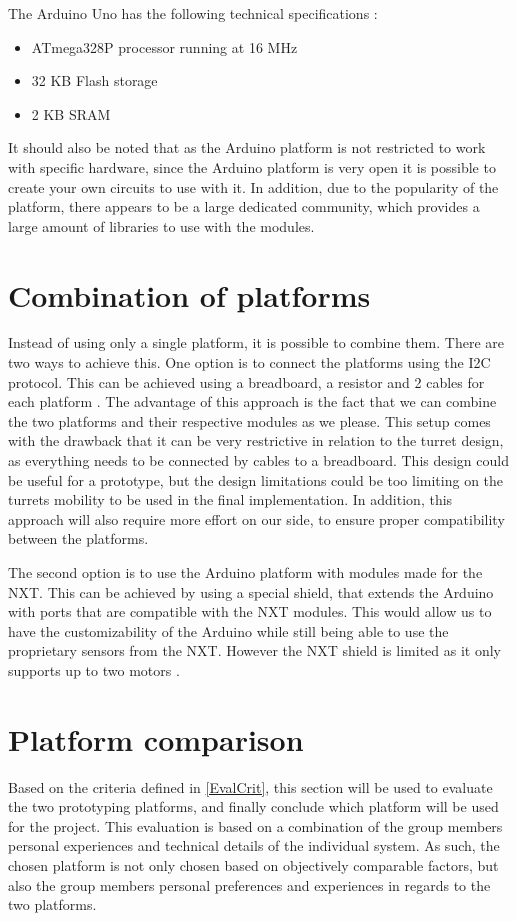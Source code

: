 The Arduino Uno has the following technical specifications \citep{UNOSpecs}:

\begin{itemize}
  \item ATmega328P processor running at 16 MHz 
  \item 32 KB Flash storage
  \item 2 KB SRAM
\end{itemize}

It should also be noted that as the Arduino platform is not restricted to work
with specific hardware, since the Arduino platform is very open it is possible
to create your own circuits to use with it. In addition, due to the popularity
of the platform, there appears to be a large dedicated community, which provides
a large amount of libraries to use with the modules. 

\section{Combination of platforms}\label{CombPlat}
Instead of using only a single platform, it is possible to combine them. There
are two ways to achieve this. One option is to connect the platforms using the
I2C protocol. This can be achieved using a breadboard, a
resistor and 2 cables for each platform \citep{ArduinoNXT}. The advantage of
this approach is the fact that we can combine the two platforms and their
respective modules as we please. This setup comes with the drawback that it can
be very restrictive in relation to the turret design, as everything needs to be
connected by cables to a breadboard. This design could be useful for a
prototype, but the design limitations could be too limiting on the turrets
mobility to be used in the final implementation. In addition, this approach will
also require more effort on our side, to ensure proper compatibility between the
platforms. \nl

The second option is to use the Arduino platform with modules made
for the NXT. This can be achieved by using a special shield, that
extends the Arduino with ports that are compatible with the NXT modules. This
would allow us to have the customizability of the Arduino while still being able
to use the proprietary sensors from the NXT. However the NXT shield is limited
as it only supports up to two motors \citep{NXTShield}. 

\section{Platform comparison}
Based on the criteria defined in \autoref{EvalCrit}, this section will be used
to evaluate the two prototyping platforms, and finally conclude which platform
will be used for the \name project. This evaluation is based on a combination of
the group members personal experiences and technical details of the individual
system.
As such, the chosen platform is not only chosen based on objectively comparable
factors, but also the group members personal preferences and experiences in
regards to the two platforms.

